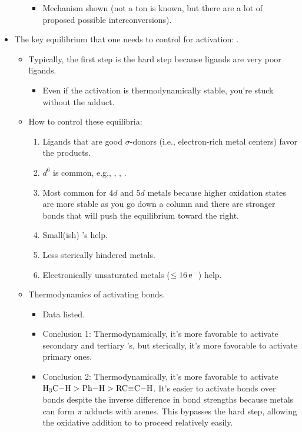 \documentclass[../notes.tex]{subfiles}
\begin{document}
\begin{itemize}
\begin{itemize}
\begin{itemize}
            \item Mechanism shown (not a ton is known, but there are a lot of proposed possible interconversions).
        \end{itemize}
    \end{itemize}
    \item The key equilibrium that one needs to control for  activation: .
    \begin{itemize}
        \item Typically, the first step is the hard step because  ligands are very poor ligands.
        \begin{itemize}
            \item Even if the  activation is thermodynamically stable, you're stuck without the adduct.
        \end{itemize}
        \item How to control these equilibria:
        \begin{enumerate}
            \item Ligands that are good $\sigma$-donors (i.e., electron-rich metal centers) favor the products.
            \item {} $d^6$ is common, e.g., , , .
            \item Most common for $4d$ and $5d$ metals because higher oxidation states are more stable as you go down a column and there are stronger bonds that will push the equilibrium toward the right.
            \item Small(ish) 's help.
            \item Less sterically hindered metals.
            \item Electronically unsaturated metals ($\leq 16\,\e[-]$) help.
        \end{enumerate}
        \item Thermodynamics of activating  bonds.
        \begin{itemize}
            \item Data listed.
            \item Conclusion 1: Thermodynamically, it's more favorable to activate secondary and tertiary 's, but sterically, it's more favorable to activate primary ones.
            \item Conclusion 2: Thermodynamically, it's more favorable to activate $\ce{H3C-H}>\ce{Ph-H}>\ce{RC#C-H}$. It's easier to activate  bonds over  bonds despite the inverse difference in bond strengths because metals can form $\pi$ adducts with arenes. This bypasses the hard step, allowing the oxidative addition to  to proceed relatively easily.

\end{itemize}
\end{itemize}
\end{itemize}
\end{document}
